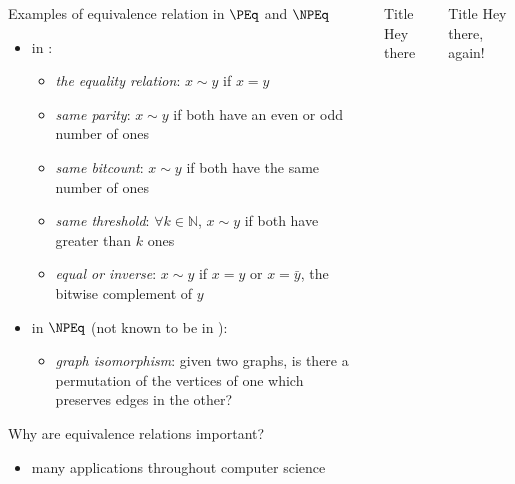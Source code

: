 \documentclass[final]{beamer}
\begin{document}
\begin{frame}{}
\begin{columns}[t]
\begin{column}{.3\linewidth}
      \begin{block}{\LARGE Examples of equivalence relation in $\PEq$ and
          $\NPEq$}
        \Large
        \begin{itemize}
        \item in \PEq:
          \begin{itemize}\Large
          \item \emph{the equality relation}: $x\sim y$ if $x=y$
          \item \emph{same parity}: $x\sim y$ if both have an even or odd
            number of ones
          \item \emph{same bitcount}: $x\sim y$ if both have the same number of
            ones
          \item \emph{same threshold}: $\forall k\in\mathbb{N}$, $x\sim y$ if
            both have greater than $k$ ones
          \item \emph{equal or inverse}: $x\sim y$ if $x=y$ or $x=\bar{y}$, the
            bitwise complement of $y$
          \end{itemize}
        \item in $\NPEq$ (not known to be in \PEq):
          \begin{itemize}\Large
          \item \emph{graph isomorphism}: given two graphs, is there a
            permutation of the vertices of one which preserves edges in the
            other?
          \end{itemize}
        \end{itemize}
      \end{block}

      \begin{block}{\LARGE Why are equivalence relations important?}
        \begin{itemize}
        \item many applications throughout computer science
          
        \end{itemize}
      \end{block}
    \end{column}

    \begin{column}{.3\linewidth}
      \begin{block}{\large Title}
        Hey there
      \end{block}
    \end{column}

    \begin{column}{.3\linewidth}
      \begin{block}{\large Title}
        Hey there, again!
      \end{block}
    \end{column}
  \end{columns}
\end{frame}
\end{document}
